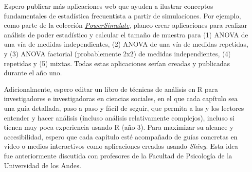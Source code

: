 \documentclass[11pt,a4paper,]{awesome-cv}
\begin{document}
\begin{footnotesize}

Espero publicar más aplicaciones web que ayuden a ilustrar conceptos fundamentales de estadística frecuentista a partir de simulaciones. Por ejemplo, como parte de la colección \href{https://shiny.jdl-svr.lat/PowerSimulate/}{\textit{PowerSimulate}}, planeo crear aplicaciones para realizar análisis de poder estadístico y calcular el tamaño de muestra para (1) ANOVA de una vía de medidas independientes, (2) ANOVA de una vía de medidas repetidas, y (3) ANOVA factorial (probablemente 2x2) de medidas independientes, (4) repetidas y (5) mixtas. Todas estas aplicaciones serían creadas y publicadas durante el año uno.

Adicionalmente, espero editar un libro de técnicas de análisis en R para investigadores e investigadoras en ciencias sociales, en el que cada capítulo sea una guía detallada, paso a paso y fácil de seguir, que permita a las y los lectores entender y hacer análisis (incluso análisis relativamente complejos), incluso si tienen muy poca experiencia usando R (año 3). Para maximizar su alcance y accesibilidad, espero que cada capítulo esté acompañado de guías concretas en video o medios interactivos como aplicaciones creadas usando \textit{Shiny}. Esta idea fue anteriormente discutida con profesores de la Facultad de Psicología de la Universidad de los Andes. 

\end{footnotesize}
\end{document}
